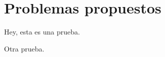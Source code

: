 \section{Problemas propuestos}

\begin{section-problem}
    Hey, esta es una prueba.
\end{section-problem}

\begin{section-lemma}
    Otra prueba.
\end{section-lemma}
